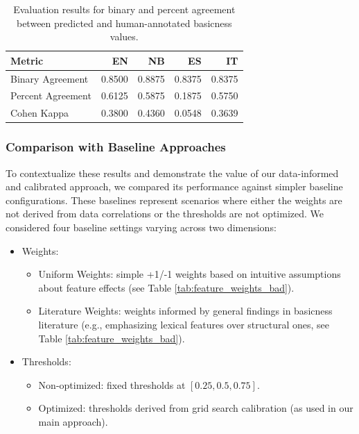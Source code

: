 \documentclass[preprint,12pt,authoryear]{elsarticle}
\begin{document}
\begin{table}[ht]
\centering
\caption{Evaluation results for binary and percent agreement between predicted and human-annotated basicness values.}
\label{tab:agreement_scores}
\begin{tabular}{@{}l r r r r@{}}
\toprule
\textbf{Metric} & \textbf{EN} & \textbf{NB} & \textbf{ES} & \textbf{IT} \\ 
\midrule
Binary Agreement     & \cellcolor{gray!85} 0.8500 & \cellcolor{gray!90} 0.8875 & \cellcolor{gray!82} 0.8375 & \cellcolor{gray!82} 0.8375 \\
Percent Agreement    & \cellcolor{gray!70} 0.6125 & \cellcolor{gray!67} 0.5875 & \cellcolor{gray!22} 0.1875 & \cellcolor{gray!65} 0.5750 \\
Cohen Kappa          & \cellcolor{gray!43} 0.3800 & \cellcolor{gray!49} 0.4360 & \cellcolor{gray!5} 0.0548  & \cellcolor{gray!41} 0.3639 \\
\bottomrule
\end{tabular}
\smallskip
\end{table}





\subsubsection{Comparison with Baseline Approaches}

To contextualize these results and demonstrate the value of our data-informed and calibrated approach, we compared its performance against simpler baseline configurations. These baselines represent scenarios where either the weights are not derived from data correlations or the thresholds are not optimized. We considered four baseline settings varying across two dimensions:

\begin{itemize}
    \item Weights: \begin{itemize}
        \item Uniform Weights: simple +1/-1 weights based on intuitive assumptions about feature effects (see Table \ref{tab:feature_weights_bad}).
        \item Literature Weights: weights informed by general findings in basicness literature \cite{hollink_predicting_2020,hajibayova_basic-level_2013} (e.g., emphasizing lexical features over structural ones, see Table \ref{tab:feature_weights_bad}).
    \end{itemize}
    \item Thresholds: \begin{itemize}
        \item Non-optimized: fixed thresholds at $[0.25, 0.5, 0.75]$.
        \item Optimized: thresholds derived from grid search calibration (as used in our main approach).
    \end{itemize}
\end{itemize}
\end{document}

